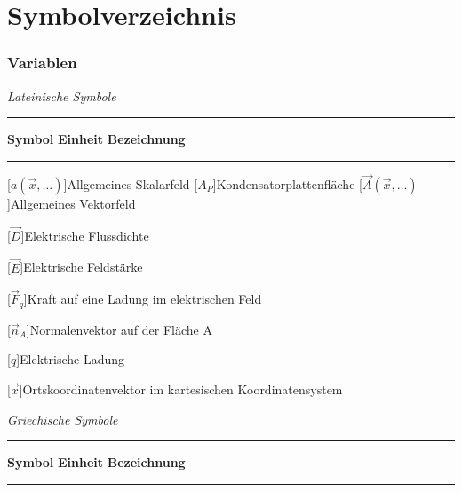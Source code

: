 \chapter*{Symbolverzeichnis}


\subsection*{Variablen}
\vspace{\linespace}
\textit{Lateinische Symbole} \\[.5\linespace]
\noindent\rule{\textwidth}{0.5pt}
\textbf{Symbol} \hspace{12.5mm} \textbf{Einheit} \hspace{10.5mm} \textbf{Bezeichnung} \\[-\linespace]
\noindent\rule{\textwidth}{0.5pt}

\begin{acronym}[Platzhalterwort]

[$a(\vec x,\ldots)$]{\acrounit{-}Allgemeines Skalarfeld}
[$A_P$]{\acrounit{\square\meter}Kondensatorplattenfläche}
[$\vec A(\vec x,\ldots)$]{\acrounit{-}Allgemeines Vektorfeld}


[$\vec D$]{\acrounit{\ampere\second\per\square\meter}Elektrische Flussdichte}

[$\vec E$]{\acrounit{\volt\per\meter}Elektrische Feldstärke}

[$\vec F_q$]{\acrounit{\newton}Kraft auf eine Ladung im elektrischen Feld}

[$\vec n_A$]{Normalenvektor auf der Fläche A}

[$q$]{\acrounit{\ampere\second}Elektrische Ladung}

[$\vec x$]{\acrounit{-}Ortskoordinatenvektor im kartesischen Koordinatensystem}

\end{acronym}
\newpage



\textit{Griechische Symbole} \\[.5\linespace]
\noindent\rule{\textwidth}{0.5pt}
\textbf{Symbol} \hspace{12.5mm} \textbf{Einheit} \hspace{10.5mm} \textbf{Bezeichnung} \\[-\linespace]
\noindent\rule{\textwidth}{0.5pt}

